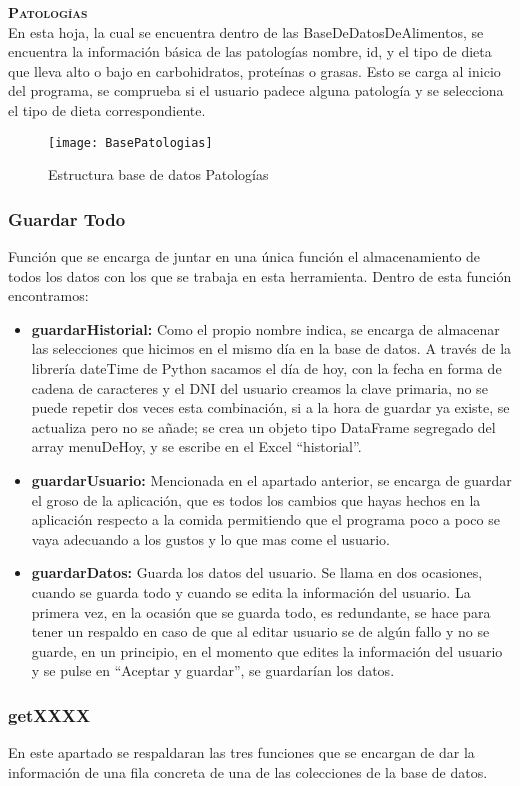 \textbf{\textsc{Patologías}}\\
En esta hoja, la cual se encuentra dentro de las BaseDeDatosDeAlimentos, se encuentra la información básica de las patologías nombre, id, y el tipo de dieta que lleva alto o bajo en carbohidratos, proteínas o grasas. Esto se carga al inicio del programa, se comprueba si el usuario padece alguna patología y se selecciona el tipo de dieta correspondiente.
\begin{figure}[htb]
\centering
\texttt{[image: BasePatologias]} 
\caption{Estructura base de datos Patologías}
\end{figure}
\subsubsection{Guardar Todo}
Función que se encarga de juntar en una única función el almacenamiento de todos los datos con los que se trabaja en esta herramienta. Dentro de esta función encontramos:
\begin{itemize}
\item	\textbf{guardarHistorial:} Como el propio nombre indica, se encarga de almacenar las selecciones que hicimos en el mismo día en la base de datos. A través de la librería dateTime de Python sacamos el día de hoy, con la fecha en forma de cadena de caracteres y el DNI del usuario creamos la clave primaria, no se puede repetir dos veces esta combinación, si a la hora de guardar ya existe, se actualiza pero no se añade; se crea un objeto tipo DataFrame segregado del array menuDeHoy, y se escribe en el Excel “historial”.
\item	\textbf{guardarUsuario:} Mencionada en el apartado anterior, se encarga de guardar el groso de la aplicación, que es todos los cambios que hayas hechos en la aplicación respecto a la comida permitiendo que el programa poco a poco se vaya adecuando a los gustos y lo que mas come el usuario.
\item	\textbf{guardarDatos:} Guarda los datos del usuario. Se llama en dos ocasiones, cuando se guarda todo y cuando se edita la información del usuario. La primera vez, en la ocasión que se guarda todo, es redundante, se hace para tener un respaldo en caso de que al editar usuario se de algún fallo y no se guarde, en un principio, en el momento que edites la información del usuario y se pulse en “Aceptar y guardar”, se guardarían los datos.
\end{itemize}

\subsubsection{getXXXX}
En este apartado se respaldaran las tres funciones que se encargan de dar la información de una fila concreta de una de las colecciones de la base de datos.
